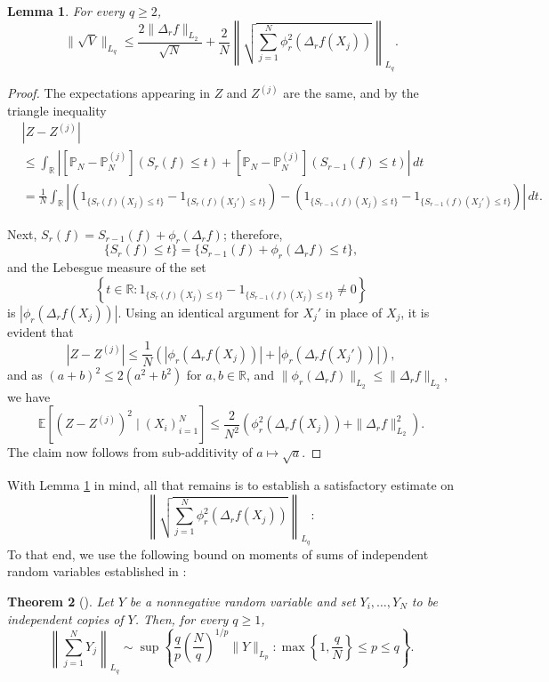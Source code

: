 \documentclass[11pt]{amsart}
\newcommand{\R}{\mathbb{R}}
\newtheorem{theorem}{Theorem}[section]
\newtheorem{lemma}[theorem]{Lemma}
\theoremstyle{definition}
\newcommand{\E}{\mathbb{E}}
\renewcommand{\P}{\mathbb{P}}
\numberwithin{equation}{section}
\begin{document}
\begin{lemma}
\label{lem:control.V.1}
For every $q\geq 2$, 
\[\|\sqrt V\|_{L_{q}}
\leq \frac{2 \|\Delta_{r}f \|_{L_{2}}}{\sqrt N}  +  \frac{2}{N}  \left\|  \sqrt{ \sum_{j=1}^{N}  \phi_{r}^{2}(\Delta_{r}f(X_{j}))  }\right\|_{L_{q}}.\]
\end{lemma}
\begin{proof}
The expectations appearing in $Z$ and $Z^{(j)}$ are the same, and by the triangle inequality
\begin{align*}
&|Z-Z^{(j)}|\\
&\leq \int_{\R} \left| [\P_{N} - \P_{N}^{(j)}] (S_{r}(f)\leq t ) +  [\P_{N} - \P_{N}^{(j)}] (S_{r-1}(f)\leq t )   \right| \,dt\\
&=  \frac{1}{N}\int_{\R} \left| \left( 1_{\{ S_{r}(f)(X_{j})\leq t \}}-  1_{ \{S_{r}(f)(X_{j}')\leq t \} } \right) - \left( 1_{ \{ S_{r-1}(f)(X_{j})\leq t \} }   - 1_{ \{ S_{r-1}(f)(X_{j}')\leq t \}}   \right) \right| \,dt.
\end{align*}

Next, $S_{r}(f)  = S_{r-1}(f)  + \phi_{r}(\Delta_{r }f )$; therefore,
\[ \{S_{r}(f) \leq t\} = \{ S_{r-1}(f)  + \phi_{r}(\Delta_{r }f )\leq t\} , \]
and the Lebesgue measure of the set 
\[ \left\{ t\in\R : 1_{ \{ S_{r}(f)(X_{j})\leq t \} } - 1_{ \{ S_{r-1}(f)(X_{j})\leq t \} }  \neq 0 \right\}\]
is $|\phi_{r}(\Delta_{r}f(X_{j}))|$.
Using an identical argument for  $X_{j}'$ in place of $X_j$, it is evident that
\[ |Z-Z^{(j)}| \leq  \frac{1}{N} \left(  |\phi_{r}(\Delta_{r}f(X_{j}))|  +   |\phi_{r}(\Delta_{r}f(X_{j}'))| \right),\]
and as $(a+b)^{2}\leq 2 (a^{2} + b^{2})$ for $a,b\in\R$, and $\| \phi_{r}(\Delta_{r}f)\|_{L_{2}}\leq \|\Delta_{r}f\|_{L_{2}}$, we have
\[ \E\left[ \left(Z-Z^{(j)} \right)^{2} \mid (X_{i})_{i=1}^{N}\right] 
\leq  \frac{2}{N^{2}} \left(  \phi_{r}^{2}(\Delta_{r}f(X_{j}))  +   \|\Delta_{r}f \|_{L_{2}}^{2} \right) . \]
The claim now follows from sub-additivity of $a\mapsto \sqrt{a}$.
\end{proof}	


With Lemma \ref{lem:control.V.1} in mind, all that remains is to establish a satisfactory estimate on 
\[\left\|  \sqrt{ \sum_{j=1}^{N}  \phi_{r}^{2}(\Delta_{r}f(X_{j}))  }\right\|_{L_{q}}:\]
To that end, we use the following bound on moments of sums of independent random variables established in \cite{latala1997estimation}:

\begin{theorem}[{\cite[Corollary 1]{latala1997estimation}}]
\label{thm:latala}
Let $Y$ be a nonnegative random variable and set $Y_{i},\dots, Y_{N}$ to be independent copies of $Y$.
Then, for every $q\geq 1$,
\[ \left\|  \sum_{j=1}^{N}  Y_{j} \right\|_{L_{q}} 
\sim \sup\left\{ \frac{q}{p} \left( \frac{ N}{q} \right)^{1/p}  \| Y  \|_{L_{p}} : \max\left\{1,\frac{q}{N}\right\} \leq p \leq q \right\}.\]
\end{theorem}
\end{document}

